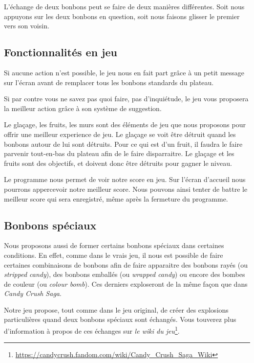\documentclass[11pt,a4paper]{article}
\begin{document}
L'échange de deux bonbons peut se faire de deux manières différentes. Soit nous appuyons 
sur les deux bonbons en question, soit nous faisons glisser le premier vers son voisin.

\subsection{Fonctionnalités en jeu}

Si aucune action n'est possible, le jeu nous en fait part grâce à un petit 
message sur l'écran avant de remplacer tous les bonbons standards du plateau.

Si par contre vous ne savez pas quoi faire, pas d'inquiétude, le jeu vous proposera 
la meilleur action grâce à son système de suggestion.

Le glaçage, les fruits, les murs sont des éléments de jeu que nous proposons 
pour offrir une meilleur experience de jeu. Le glaçage se voit être détruit quand les bonbons 
autour de lui sont détruits. Pour ce qui est d'un fruit, il faudra le faire parvenir tout-en-bas du 
plateau afin de le faire disparraitre. Le glaçage et les fruits sont des objectifs, et doivent donc 
être détruits pour gagner le niveau.

Le programme nous permet de voir notre score en jeu.
Sur l'écran d'accueil nous pourrons appercevoir notre meilleur score. Nous pouvons ainsi 
tenter de battre le meilleur score qui sera enregistré, même après la fermeture du programme.

\subsection{Bonbons spéciaux}

Nous proposons aussi de former certains bonbons
spéciaux dans certaines conditions. En effet, comme dans le vrais jeu, 
il nous est possible de faire certaines combinaisons de bonbons afin de faire apparaitre
des bonbons rayés (ou \emph{stripped candy}), des bonbons emballés (ou \emph{wrapped candy}) 
ou encore des bombes de couleur (ou \emph{colour bomb}). Ces derniers exploseront de la 
même façon que dans \emph{Candy Crush Saga}.

Notre jeu propose, tout comme dans le jeu original, de créer des explosions
particulières quand deux bonbons spéciaux sont échangés. Vous touverez plus d'information 
à propos de ces échanges sur \emph{le wiki du jeu}\footnote{\url{https://candycrush.fandom.com/wiki/Candy_Crush_Saga_Wiki}}.
\end{document}
